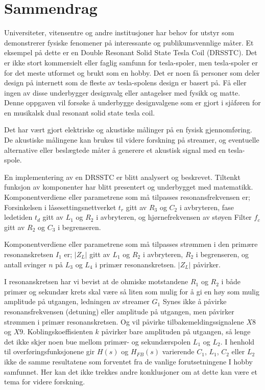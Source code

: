 \section*{Sammendrag}
Universiteter, vitensentre og andre institusjoner har behov for utstyr som demonstrerer fysiske fenomener på interessante og publikumsvennlige måter. Et eksempel på dette er en Double Resonant Solid State Tesla Coil (DRSSTC). Det er ikke stort kommersielt eller faglig samfunn for tesla-spoler, men tesla-spoler er for det meste utformet og brukt som en hobby. Det er noen få personer som deler design på internett som de fleste av tesla-spolens design er basert på. Få eller ingen av disse underbygger designvalg eller antagelser med fysikk og matte. Denne oppgaven vil forsøke å underbygge designvalgene som er gjort i sjåføren for en musikalsk dual resonant solid state tesla coil.

Det har vært gjort elektriske og akustiske målinger på en fysisk gjennomføring. De akustiske målingene kan brukes til videre forskning på streamer, og eventuelle alternative eller beslægtede måter å generere et akustisk signal med en tesla-spole.

En implementering av en DRSSTC er blitt analysert og beskrevet. Tiltenkt funksjon av komponenter har blitt presentert og underbygget med matematikk. Komponentverdiene eller parametrene som må tilpasses resonansfrekvensen er; Forsinkelsen i låsesettingsnettverket $ t_r $ gitt av $ R_3 $ og $ C_2 $ i avbryteren, fase ledetiden $ t_d $ gitt av $ L_1 $ og $ R_2 $ i avbryteren, og hjørnefrekvensen av støyen Filter $ f_c $ gitt av $ R_2 $ og $ C_3 $ i begrenseren.

Komponentverdiene eller parametrene som må tilpasses strømmen i den primære resonanskretsen $ I_1 $ er; $ | Z_L | $ gitt av $ L_1 $ og $ R_2 $ i avbryteren, $ R_2 $ i begrenseren, og antall svinger $ n $ på $ L_3 $ og $ L_4 $ i primær resonanskretsen. $ | Z_L | $ påvirker.

I resonanskretsen har vi bevist at de ohmiske motstandene $ R_1 $ og $ R_2 $ i både primær og sekundær krets skal være så liten som mulig for å gi en høy som mulig amplitude på utgangen, ledningen av streamer $ G_1 $ Synes ikke å påvirke resonansfrekvensen (detuning) eller amplitude på utgangen, men påvirker strømmen i primær resonanskretsen. Og vil påvirke tilbakemeldingssignalene $ X8 $ og $ X9 $. Koblingskoeffisienten $ k $ påvirker bare amplituden på utgangen, så lenge det ikke skjer noen bue mellom primær- og sekundærspolen $ L_1 $ og $ L_2 $. I henhold til overføringsfunksjonene gir $ H (s) $ og $ H_ {FB} (s) $ varierende $ C_1 $, $ L_1 $, $ C_2 $ eller $ L_2 $ ikke de samme resultatene som forventet fra de vanlige forutsetningene I hobby samfunnet. Her kan det ikke trekkes andre konklusjoner om at dette kan være et tema for videre forskning.
